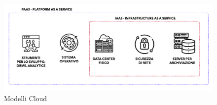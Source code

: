 \begin{figure}[h]
    \centering
    \includegraphics[width=150mm]{images/Infrastrutture.png}
    \caption{Modelli Cloud \label{overflow}}
\end{figure}

\clearpage

